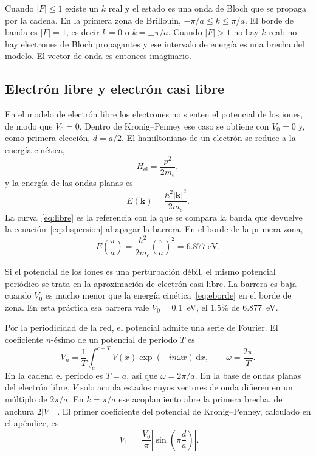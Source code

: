 \documentclass[hidelinks]{article}
\begin{document}
Cuando $|F|\leq 1$ existe un $k$ real y el estado es una onda de Bloch que se propaga por la cadena. En la primera zona de Brillouin, $-\pi/a\leq k\leq\pi/a$. El borde de banda es $|F|=1$, es decir $k=0$ o $k=\pm\pi/a$. Cuando $|F|>1$ no hay $k$ real: no hay electrones de Bloch propagantes y ese intervalo de energía es una brecha del modelo. El vector de onda es entonces imaginario.

\subsection{Electrón libre y electrón casi libre}

En el modelo de electrón libre los electrones no sienten el potencial de los iones, de modo que $V_0=0$. Dentro de Kronig--Penney ese caso se obtiene con $V_0=0$ y, como primera elección, $d=a/2$. El hamiltoniano de un electrón se reduce a la energía cinética,
\begin{equation}
H_{\mathrm{el}}=\frac{p^2}{2m_e},
\end{equation}
y la energía de las ondas planas es
\begin{equation}
E(\mathbf{k})=\frac{\hbar^2|\mathbf{k}|^2}{2m_e}.
\label{eq:libre}
\end{equation}
La curva~\eqref{eq:libre} es la referencia con la que se compara la banda que devuelve la ecuación~\eqref{eq:dispersion} al apagar la barrera. En el borde de la primera zona,
\begin{equation}
E\!\left(\frac{\pi}{a}\right)=\frac{\hbar^2}{2m_e}\left(\frac{\pi}{a}\right)^2=6.877~\text{eV}.
\label{eq:eborde}
\end{equation}

Si el potencial de los iones es una perturbación débil, el mismo potencial periódico se trata en la aproximación de electrón casi libre. La barrera es baja cuando $V_0$ es mucho menor que la energía cinética~\eqref{eq:eborde} en el borde de zona. En esta práctica esa barrera vale $V_0=0.1$~eV, el $1.5\%$ de $6.877$~eV.

Por la periodicidad de la red, el potencial admite una serie de Fourier. El coeficiente $n$-ésimo de un potencial de periodo $T$ es
\begin{equation}
V_n=\frac{1}{T}\int_{c}^{c+T}V(x)\exp(-in\omega x)\,\mathrm{d}x,
\qquad\omega=\frac{2\pi}{T}.
\label{eq:fourier}
\end{equation}
En la cadena el periodo es $T=a$, así que $\omega=2\pi/a$. En la base de ondas planas del electrón libre, $V$ solo acopla estados cuyos vectores de onda difieren en un múltiplo de $2\pi/a$. En $k=\pi/a$ ese acoplamiento abre la primera brecha, de anchura $2|V_1|$ \cite{kittel}. El primer coeficiente del potencial de Kronig--Penney, calculado en el apéndice, es
\begin{equation}
|V_1|=\frac{V_0}{\pi}\left|\sin\left(\pi\frac{d}{a}\right)\right|.
\label{eq:V1mod}
\end{equation}
\end{document}
